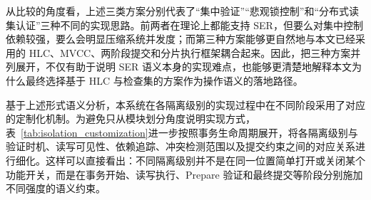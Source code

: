 从比较的角度看，上述三类方案分别代表了“集中验证”“悲观锁控制”和“分布式读集认证”三种不同的实现思路。前两者在理论上都能支持 SER，但要么对集中控制依赖较强，要么会明显压缩系统并发度；而第三种方案能够更自然地与本文已经采用的 HLC、MVCC、两阶段提交和分片执行框架耦合起来。因此，把三种方案并列展开，不仅有助于说明 SER 语义本身的实现难点，也能够更清楚地解释本文为什么最终选择基于 HLC 与检查集的方案作为操作语义的落地路径。

基于上述形式语义分析，本系统在各隔离级别的实现过程中在不同阶段采用了对应的定制化机制。为避免只从模块划分角度说明实现方式，表~\ref{tab:isolation_customization}进一步按照事务生命周期展开，将各隔离级别与验证时机、读写可见性、依赖追踪、冲突检测范围以及提交约束之间的对应关系进行细化。这样可以直接看出：不同隔离级别并不是在同一位置简单打开或关闭某个功能开关，而是在事务开始、读写执行、Prepare 验证和最终提交等阶段分别施加不同强度的语义约束。

